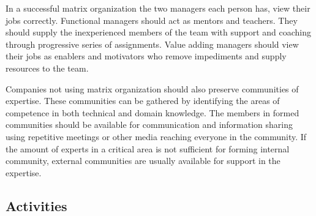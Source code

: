 In a successful matrix organization the two managers each person has, view their jobs correctly. Functional managers should act as mentors and teachers. They should supply the inexperienced members of the team with support and coaching through progressive series of assignments. Value adding managers should view their jobs as enablers and motivators who remove impediments and supply resources to the team.~\cite{poppendieck2003LSD}

Companies not using matrix organization should also preserve communities of expertise. These communities can be gathered by identifying the areas of competence in both technical and domain knowledge. The members in formed communities should be available for communication and information sharing using repetitive meetings or other media reaching everyone in the community. If the amount of experts in a critical area is not sufficient for forming internal community, external communities are usually available for support in the expertise.~\cite{poppendieck2003LSD}



\subsection{Activities}


